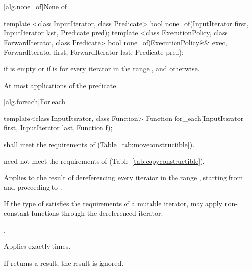[alg.none_of]{None of}

%
\begin{itemdecl}
template <class InputIterator, class Predicate>
  bool none_of(InputIterator first, InputIterator last, Predicate pred);
template <class ExecutionPolicy, class ForwardIterator, class Predicate>
  bool none_of(ExecutionPolicy&& exec, ForwardIterator first, ForwardIterator last,
               Predicate pred);
\end{itemdecl}

\begin{itemdescr}
\pnum
\returns {} if
 is empty or if
 is  for every iterator  in the range , and  otherwise.

\pnum
\complexity At most  applications of the predicate.
\end{itemdescr}

[alg.foreach]{For each}

%
\begin{itemdecl}
template<class InputIterator, class Function>
  Function for_each(InputIterator first, InputIterator last, Function f);
\end{itemdecl}

\begin{itemdescr}
\pnum
\requires {} shall meet the requirements of
 (Table~\ref{tab:moveconstructible}).
\begin{note}  need not meet the requirements of
 (Table~\ref{tab:copyconstructible}). \end{note}

\pnum
\effects
Applies
 to the result of dereferencing every iterator in the range
,
starting from
and proceeding to
.
\begin{note} If the type of  satisfies the
requirements of a mutable iterator,  may apply non-constant
functions through the dereferenced iterator.\end{note}

\pnum
\returns
{}.

\pnum
\complexity
Applies 
exactly
times.

\pnum
\remarks
If  returns a result, the result is ignored.
\end{itemdescr}

